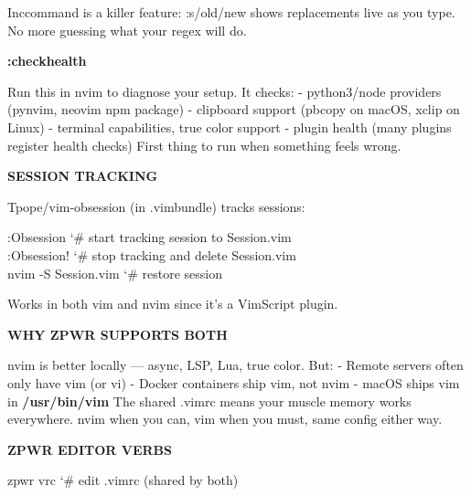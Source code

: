 \documentclass[11pt,a4paper,twoside]{book}
\begin{document}
Inccommand is a killer feature: :s/old/new shows replacements live as you type. No more guessing what your regex will do.


\vspace{12pt}
{\bfseries\color{neonyellow} :checkhealth}\vspace{4pt}

Run this in nvim to diagnose your setup. It checks: - python3/node providers (pynvim, neovim npm package) - clipboard support (pbcopy on macOS, xclip on Linux) - terminal capabilities, true color support - plugin health (many plugins register health checks) First thing to run when something feels wrong.


\vspace{12pt}
{\bfseries\color{neonyellow} SESSION TRACKING}\vspace{4pt}

Tpope/vim-obsession (in .vimbundle) tracks sessions:

\begin{codebox}
\color{neongreen}:Obsession           {\char`\#} start tracking session to Session.vim\\
\color{neongreen}:Obsession!          {\char`\#} stop tracking and delete Session.vim\\
\color{neongreen}nvim -S Session.vim  {\char`\#} restore session\\
\end{codebox}

Works in both vim and nvim since it's a VimScript plugin.


\vspace{12pt}
{\bfseries\color{neonyellow} WHY \textbf{ZPWR} SUPPORTS BOTH}\vspace{4pt}

nvim is better locally — async, LSP, Lua, true color. But: - Remote servers often only have vim (or vi) - Docker containers ship vim, not nvim - macOS ships vim in \textbf{\textbf{/usr/bin/vim}} The shared .vimrc means your muscle memory works everywhere. nvim when you can, vim when you must, same config either way.


\vspace{12pt}
{\bfseries\color{neonyellow} \textbf{ZPWR} \textbf{EDITOR} VERBS}\vspace{4pt}

\begin{codebox}
\color{neongreen}zpwr vrc             {\char`\#} edit .vimrc (shared by both)\\
\end{codebox}
\end{document}
